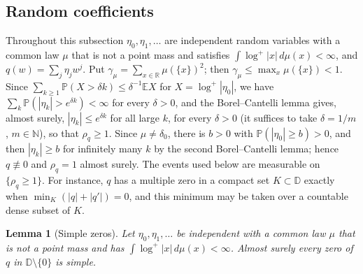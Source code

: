 \documentclass[11pt]{amsart}
\newtheorem{lemma}[theorem]{Lemma}
\theoremstyle{definition}
\theoremstyle{remark}
\numberwithin{equation}{section}
\newcommand{\R}{\mathbb{R}}
\newcommand{\N}{\mathbb{N}}
\newcommand{\D}{\mathbb{D}}
\newcommand{\E}{\mathbb{E}}
\newcommand{\PP}{\mathbb{P}}
\begin{document}
\subsection{Random coefficients}

Throughout this subsection $\eta_0,\eta_1,\dots$ are independent random variables with a common law $\mu$ that is not a point mass and satisfies $\int\log^+|x|\,d\mu(x)<\infty$, and $q(w)=\sum_j\eta_jw^j$. Put $\gamma_\mu=\sum_{x\in\R}\mu(\{x\})^2$; then $\gamma_\mu\le\max_x\mu(\{x\})<1$. Since $\sum_{k\ge1}\PP(X>\delta k)\le\delta^{-1}\E X$ for $X=\log^+|\eta_0|$, we have $\sum_k\PP(|\eta_k|>e^{\delta k})<\infty$ for every $\delta>0$, and the Borel--Cantelli lemma gives, almost surely, $|\eta_k|\le e^{\delta k}$ for all large $k$, for every $\delta>0$ (it suffices to take $\delta=1/m$, $m\in\N$), so that $\rho_q\ge1$. Since $\mu\ne\delta_0$, there is $b>0$ with $\PP(|\eta_0|\ge b)>0$, and then $|\eta_k|\ge b$ for infinitely many $k$ by the second Borel--Cantelli lemma; hence $q\not\equiv0$ and $\rho_q=1$ almost surely. The events used below are measurable on $\{\rho_q\ge1\}$. For instance, $q$ has a multiple zero in a compact set $K\subset\D$ exactly when $\min_K(|q|+|q'|)=0$, and this minimum may be taken over a countable dense subset of $K$.

\begin{lemma}[Simple zeros]\label{lem:resample}
Let $\eta_0,\eta_1,\dots$ be independent with a common law $\mu$ that is not a point mass and has $\int\log^+|x|\,d\mu(x)<\infty$. Almost surely every zero of $q$ in $\D\setminus\{0\}$ is simple.
\end{lemma}
\end{document}
